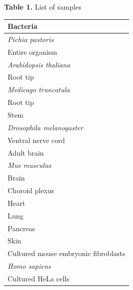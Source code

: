 \documentclass{article}
\begin{document}
\noindent\textbf{Table 1.} List of samples
\begin{center}
\begin{tabular}{l}
\toprule
Bacteria\\
\midrule
\textit{Pichia pastoris}\\
\quad Entire organism\\
\textit{Arabidopsis thaliana}\\
\quad Root tip\\
\textit{Medicago truncatula}\\
\quad Root tip\\
\quad Stem\\
\textit{Drosophila melanogaster}\\
\quad Ventral nerve cord\\
\quad Adult brain\\
\textit{Mus musculus}\\
\quad Brain\\
\quad Choroid plexus\\
\quad Heart\\
\quad Lung\\
\quad Pancreas\\
\quad Skin\\
\quad Cultured mouse embryonic fibroblasts\\
\textit{Homo sapiens}\\
\quad Cultured HeLa cells\\
\bottomrule
\end{tabular}
\end{center}
\end{document}
